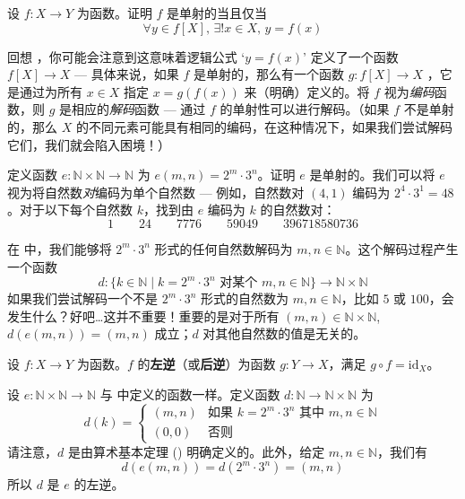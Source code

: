 \begin{exercise}
设 $f : X \to Y$ 为函数。证明 $f$ 是单射的当且仅当
\[ \forall y \in f[X],\, \exists ! x \in X,\, y=f(x) \]
\end{exercise}

回想 ，你可能会注意到这意味着逻辑公式 `$y=f(x)$' 定义了一个函数 $f[X] \to X$ --- 具体来说，如果 $f$ 是单射的，那么有一个函数 $g : f[X] \to X$ ，它是通过为所有 $x \in X$ 指定 $x=g(f(x))$ 来（明确）定义的。将 $f$ 视为\textit{编码}函数，则 $g$ 是相应的\textit{解码}函数 --- 通过 $f$ 的单射性可以进行解码。（如果 $f$ 不是单射的，那么 $X$ 的不同元素可能具有相同的编码，在这种情况下，如果我们尝试解码它们，我们就会陷入困境！）

\begin{exercise}
\label{exEncodingPairs}
定义函数 $e : \mathbb{N} \times \mathbb{N} \to \mathbb{N}$ 为 $e(m,n) = 2^m \cdot 3^n$。证明 $e$ 是单射的。我们可以将 $e$ 视为将自然数\textit{对}编码为单个自然数 --- 例如，自然数对 $(4,1)$ 编码为 $2^4 \cdot 3^1 = 48$。对于以下每个自然数 $k$，找到由 $e$ 编码为 $k$ 的自然数对：
\[ 1 \qquad 24 \qquad 7776 \qquad 59049 \qquad 396718580736 \]
\end{exercise}

在  中，我们能够将 $2^m \cdot 3^n$ 形式的任何自然数解码为 $m,n \in \mathbb{N}$。这个解码过程产生一个函数
\[ d : \{ k \in \mathbb{N} \mid k=2^m \cdot 3^n \text{ 对某个 } m,n \in \mathbb{N} \} \to \mathbb{N} \times \mathbb{N} \]
如果我们尝试解码一个不是 $2^m \cdot 3^n$ 形式的自然数为 $m,n \in \mathbb{N}$，比如 $5$ 或 $100$，会发生什么？好吧\dots{}这并不重要！重要的是对于所有 $(m,n) \in \mathbb{N} \times \mathbb{N}$, $d(e(m,n))=(m,n)$ 成立；$d$ 对其他自然数的值是无关的。

\begin{definition}
\label{defLeftInverse}
设 $f : X \to Y$ 为函数。$f$ 的\textbf{左逆}（或\textbf{后逆}）为函数 $g : Y \to X$，满足 $g \circ f = \mathrm{id}_X$。
\end{definition}

\begin{example}
设 $e : \mathbb{N} \times \mathbb{N} \to \mathbb{N}$ 与  中定义的函数一样。定义函数 $d : \mathbb{N} \to \mathbb{N} \times \mathbb{N}$ 为
\[ d(k) = \begin{cases}
(m,n) & \text{如果 } k=2^m \cdot 3^n \text{ 其中 } m,n \in \mathbb{N} \\
(0,0) & \text{否则}
\end{cases} \]
请注意，$d$ 是由算术基本定理 () 明确定义的。此外，给定 $m,n \in \mathbb{N}$，我们有
\[ d(e(m,n)) = d(2^m \cdot 3^n) = (m,n) \]
所以 $d$ 是 $e$ 的左逆。
\end{example}

